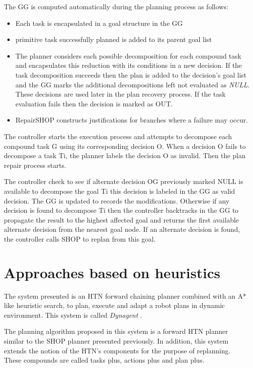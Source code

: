 The GG is computed automatically during the planning process as follows: 
\begin{itemize}
\item	Each task is encapsulated in a goal structure in the GG
\item primitive task successfully planned is added to its parent  goal list
\item	The planner considers each possible decomposition for each compound task and encapsulates this reduction with its conditions in a new decision. If the task decomposition succeeds then the plan is added to the decision’s goal list and the GG marks the additional decompositions left not evaluated as \textit{NULL}. These decisions are used later in the plan recovery process. If the task evaluation fails then the decision is marked as OUT.
\item	RepairSHOP constructs justifications for branches where a failure may occur.
\end{itemize}
The controller starts the execution process and attempts to decompose each compound task G using its corresponding decision O. When a decision O fails to decompose a task Ti, the planner labels the decision O as invalid. Then the plan repair process starts. 


The controller check to see if alternate decision OG previously marked NULL is available to decompose the goal Ti this decision is labeled in the GG as valid decision. The GG is updated to records the modifications. Otherwise if any decision is found to decompose Ti then the controller backtracks in the GG to propagate the result to the highest affected goal and returns the first available alternate decision from the nearest goal node. If an alternate decision is found, the controller calls SHOP to replan from this goal. 


 
\section{Approaches based on heuristics}
The system presented is an HTN forward chaining planner combined with an A* like heuristic search, to plan, execute and adapt a robot plans in dynamic environment. This system is called \textit{Dynagent} \cite{hayashi2006dynagent}.


The planning algorithm proposed in this system is a forward HTN planner similar to the SHOP planner presented previously. In addition, this system extends the notion of the HTN’s components for the purpose of replanning. These compounds are called tasks plus, actions plus and plan plus.

